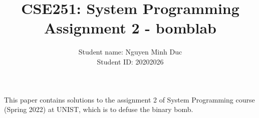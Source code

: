 \documentclass[12pt,a4paper,oneside]{extarticle}
\title{\textbf{{\large CSE251: System Programming}\\Assignment 2 - bomblab}}
\author{Student name: Nguyen Minh Duc\\Student ID: 20202026}
\date{}
\begin{document}
\pagestyle{fancy}
\fancyhf{}
\renewcommand{\headrulewidth}{1pt}
\fancyfoot[CE,CO]{\thepage}
\renewcommand{\footrulewidth}{1pt}
\makeatletter


\maketitle

This paper contains solutions to the assignment 2 of System Programming course (Spring 2022) at UNIST, which is to defuse the binary bomb.

\tableofcontents

\newpage








\end{document}
